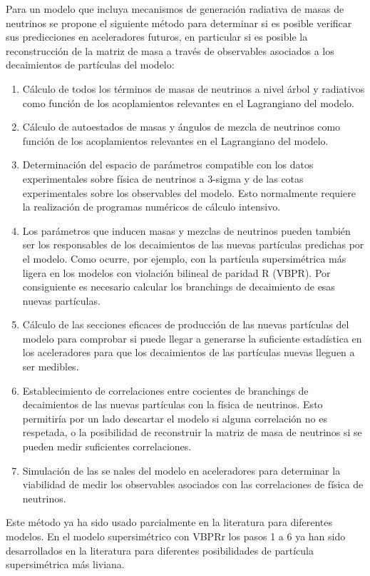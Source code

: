 Para un modelo que incluya mecanismos de generación radiativa de masas
de neutrinos se propone el siguiente método para determinar si es
posible verificar sus predicciones en aceleradores futuros, en
particular si es posible la reconstrucción de la matriz de masa a
través de observables asociados a los decaimientos de partículas del
modelo:
\begin{enumerate}
\item Cálculo de todos los términos de masas de neutrinos a nivel
  árbol y radiativos como función de los acoplamientos relevantes en
  el Lagrangiano del modelo.

\item Cálculo de autoestados de masas y ángulos de mezcla de neutrinos
  como función de los acoplamientos relevantes en el Lagrangiano del
  modelo.

\item Determinación del espacio de parámetros compatible con los datos
  experimentales sobre física de neutrinos a 3-sigma y de las cotas
  experimentales sobre los observables del modelo. Esto normalmente
  requiere la realización de programas numéricos de cálculo intensivo.

\item Los parámetros que inducen masas y mezclas de neutrinos pueden
  también ser los responsables de los decaimientos de las nuevas
  partículas predichas por el modelo. Como ocurre, por ejemplo, con la
  partícula supersimétrica más ligera en los modelos con violación
  bilineal de paridad R (VBPR). Por consiguiente es necesario calcular
  los branchings de decaimiento de esas nuevas partículas.

\item Cálculo de las secciones eficaces de producción de las nuevas
  partículas del modelo para comprobar si puede llegar a generarse la
  suficiente estadística en los aceleradores para que los decaimientos
  de las partículas nuevas lleguen a ser medibles.

\item Establecimiento de correlaciones entre cocientes de branchings
  de decaimientos de las nuevas partículas con la física de neutrinos.
  Esto permitiría por un lado descartar el modelo si alguna
  correlación no es respetada, o la posibilidad de reconstruir la
  matriz de masa de neutrinos si se pueden medir suficientes
  correlaciones.

\item Simulación de las se nales del modelo en aceleradores para
  determinar la viabilidad de medir los observables asociados con las
  correlaciones de física de neutrinos.
\end{enumerate}
Este método ya ha sido usado parcialmente en la literatura para
diferentes modelos.  En el modelo supersimétrico con VBPRr los pasos 1
a 6 ya han sido desarrollados en la literatura para diferentes
posibilidades de partícula supersimétrica más liviana.


